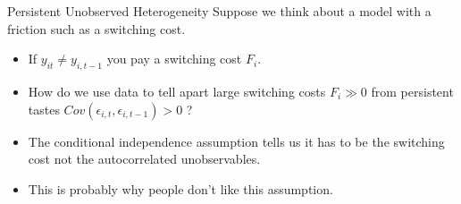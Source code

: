 %
%
%


\begin{frame}{Persistent Unobserved Heterogeneity}
Suppose we think about a model with a friction such as a switching cost.
\begin{itemize}
\item If $y_{it} \neq y_{i,t-1}$ you pay a switching cost $F_i$.
\item How do we use data to tell apart large switching costs $F_i  \gg0$ from persistent tastes $Cov(\epsilon_{i,t},\epsilon_{i,t-1}) > 0$ ?
\item The \alert{conditional independence assumption} tells us it has to be the switching cost not the autocorrelated unobservables.
\item This is probably why people don't like this assumption.
\end{itemize}
\end{frame}


